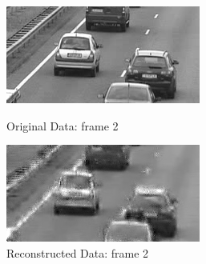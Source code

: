 \documentclass[12pt]{article}
\begin{document}
\begin{itemize}
\begin{enumerate}
    \begin{figure}[H]
        \centering
        \begin{minipage}{.45\textwidth}
            \centering
            \includegraphics[width=\linewidth]{results/cars_5_orig_2.png}
            \caption*{Original Data: frame 2}
        \end{minipage}
        \begin{minipage}{.45\textwidth}
            \centering
            \includegraphics[width=\linewidth]{results/cars_5_recon_2.png}
            \caption*{Reconstructed Data: frame 2}
        \end{minipage}
    \end{figure}
    

\end{enumerate}
\end{itemize}
\end{document}
